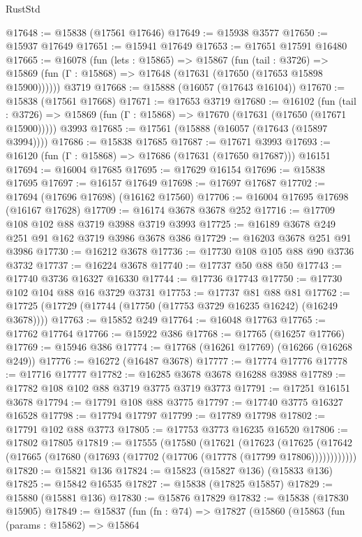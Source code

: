 \begin{lexlean}{RustStd}
\begin{coremodule}
@17648 := @15838 (@17561 @17646)
@17649 := @15938 @3577
@17650 := @15937 @17649
@17651 := @15941 @17649
@17653 := @17651 @17591 @16480
@17665 := @16078
    (fun (lets : @15865) =>
    @15867
      (fun (tail : @3726) =>
      @15869 (fun (Γ : @15868) => @17648 (@17631 (@17650 (@17653 @15898 @15900))))))
    @3719
@17668 := @15888 (@16057 (@17643 @16104))
@17670 := @15838 (@17561 @17668)
@17671 := @17653 @3719
@17680 := @16102
    (fun (tail : @3726) => @15869 (fun (Γ : @15868) => @17670 (@17631 (@17650 (@17671 @15900)))))
    @3993
@17685 := @17561 (@15888 (@16057 (@17643 (@15897 @3994))))
@17686 := @15838 @17685
@17687 := @17671 @3993
@17693 := @16120 (fun (Γ : @15868) => @17686 (@17631 (@17650 @17687))) @16151
@17694 := @16004 @17685
@17695 := @17629 @16154
@17696 := @15838 @17695
@17697 := @16157 @17649
@17698 := @17697 @17687
@17702 := @17694 (@17696 @17698) (@16162 @17560)
@17706 := @16004 @17695 @17698 (@16167 @17628)
@17709 := @16174 @3678 @3678 @252
@17716 := @17709 @108 @102 @88 @3719 @3988 @3719 @3993
@17725 := @16189 @3678 @249 @251 @91 @162 @3719 @3986 @3678 @386
@17729 := @16203 @3678 @251 @91 @3986
@17730 := @16212 @3678
@17736 := @17730 @108 @105 @88 @90 @3736 @3732
@17737 := @16224 @3678
@17740 := @17737 @50 @88 @50
@17743 := @17740 @3736 @16327 @16330
@17744 := @17736 @17743
@17750 := @17730 @102 @104 @88 @16 @3729 @3731
@17753 := @17737 @81 @88 @81
@17762 := @17725 (@17729 (@17744 (@17750 (@17753 @3729 @16235 @16242) (@16249 @3678))))
@17763 := @15852 @249
@17764 := @16048 @17763
@17765 := @17762 @17764
@17766 := @15922 @386
@17768 := @17765 (@16257 @17766)
@17769 := @15946 @386
@17774 := @17768 (@16261 @17769) (@16266 (@16268 @249))
@17776 := @16272 (@16487 @3678)
@17777 := @17774 @17776
@17778 := @17716 @17777
@17782 := @16285 @3678 @3678 @16288 @3988
@17789 := @17782 @108 @102 @88 @3719 @3775 @3719 @3773
@17791 := @17251 @16151 @3678
@17794 := @17791 @108 @88 @3775
@17797 := @17740 @3775 @16327 @16528
@17798 := @17794 @17797
@17799 := @17789 @17798
@17802 := @17791 @102 @88 @3773
@17805 := @17753 @3773 @16235 @16520
@17806 := @17802 @17805
@17819 := @17555
    (@17580
      (@17621
        (@17623
          (@17625 (@17642 (@17665 (@17680 (@17693 (@17702 (@17706 (@17778 (@17799 @17806))))))))))))
@17820 := @15821 @136
@17824 := @15823 (@15827 @136) (@15833 @136)
@17825 := @15842 @16535
@17827 := @15838 (@17825 @15857)
@17829 := @15880 (@15881 @136)
@17830 := @15876 @17829
@17832 := @15838 (@17830 @15905)
@17849 := @15837
    (fun (fn : @74) =>
    @17827
      (@15860
        (@15863
          (fun (params : @15862) =>
          @15864

\end{coremodule}
\end{lexlean}
